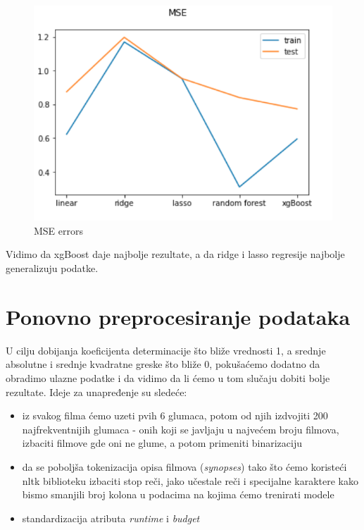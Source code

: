 \documentclass[a4paper]{article}
\begin{document}
\begin{figure}[h!]
\begin{center}
\includegraphics[scale=0.36]{mse.png}
\caption{MSE errors}
\label{fig:mse}
\end{center}
\end{figure}

Vidimo da xgBoost daje najbolje rezultate, a da ridge i lasso regresije najbolje generalizuju podatke.


\section{Ponovno preprocesiranje podataka}
\label{sec:preprocesiranje_2}

U cilju dobijanja koeficijenta determinacije što bliže vrednosti 1, a srednje absolutne i srednje kvadratne greske što bliže 0, pokušaćemo dodatno da obradimo ulazne podatke i da vidimo da li ćemo u tom slučaju dobiti bolje rezultate. Ideje za unapređenje su sledeće:

\begin{itemize}
	\item iz svakog filma ćemo uzeti pvih 6 glumaca, potom od njih izdvojiti 200 najfrekventnijih glumaca - onih koji se javljaju u najvećem broju filmova, izbaciti filmove gde oni ne glume, a potom primeniti binarizaciju
	\item da se poboljša tokenizacija opisa filmova (\textit{synopses}) tako što ćemo koristeći nltk biblioteku izbaciti stop reči, jako učestale reči i specijalne karaktere kako bismo smanjili broj kolona u podacima na kojima ćemo trenirati modele
	\item standardizacija atributa \textit{runtime} i \textit{budget}
\end{itemize}
\end{document}
